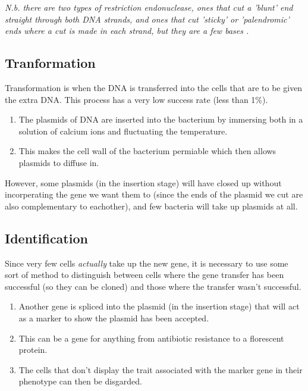 \documentclass{article}
\begin{document}
\textit{N.b. there are two types of restriction endonuclease, ones that cut a
'blunt' end straight through both DNA strands, and ones that cut 'sticky' or
'palendromic' ends where a cut is made in each strand, but they are a few bases
\apart.}

\subsection*{Tranformation}

Transformation is when the DNA is transferred into the cells that are to be given the extra DNA. This process has a very low success rate (less than 1\%).

\begin{enumerate}
	
	\item The plasmids of DNA are inserted into the bacterium by immersing both
	in a solution of calcium ions and fluctuating the temperature.

	\item This makes the cell wall of the bacterium permiable which then allows
	plasmids to diffuse in.

\end{enumerate}

However, some plasmids (in the insertion stage) will have closed up without
incorperating the gene we want them to (since the ends of the plasmid we cut are
also complementary to eachother), and few bacteria will take up plasmids at all.

\subsection*{Identification}

Since very few cells {\it actually} take up the new gene, it is necessary to use
some sort of method to distinguish between cells where the gene transfer has
been successful (so they can be cloned) and those where the transfer wasn't
successful.

\begin{enumerate}
	
	\item Another gene is spliced into the plasmid (in the insertion stage) that
	will act as a marker to show the plasmid has been accepted.

	\item This can be a gene for anything from antibiotic resistance to a
	florescent protein.

	\item The cells that don't display the trait associated with the marker gene
	in their phenotype can then be disgarded.

\end{enumerate}
\end{document}
